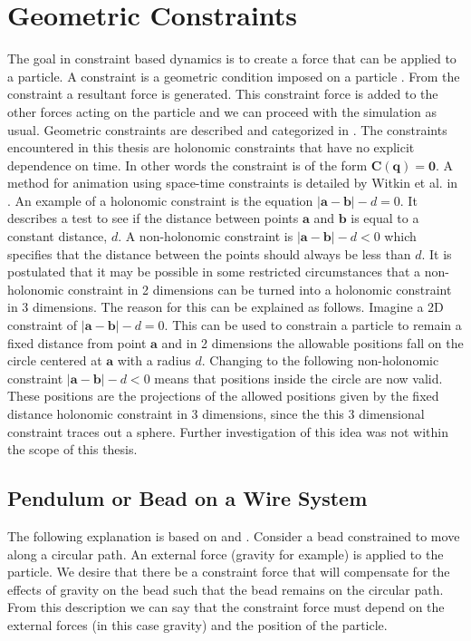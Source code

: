 \section{Geometric Constraints} The goal in constraint based dynamics is to
create a force that can be applied to a particle. A constraint is a geometric
condition imposed on a particle \cite{BarzelBarr}. From the constraint a
resultant force is generated.  This constraint force is added to the other
forces acting on the particle and we can proceed with the simulation as usual.
Geometric constraints are described and categorized in \cite{Goldstein,
ComputationalDynamics, Lee}. The constraints encountered in this thesis are
holonomic constraints that have no explicit dependence on time. In other words
the constraint is of the form $\mathbf{C(q)} = \mathbf{0}$. A method for
animation using space-time constraints is detailed by Witkin et al. in
\cite{SpacetimeConstraints}. An example of a holonomic constraint is the
equation $\vert \mathbf{a} - \mathbf{b} \vert - d = 0$. It describes a test to
see if the distance between points $\mathbf{a}$ and $\mathbf{b}$ is equal to a
constant distance, $d$. A non-holonomic constraint is $\vert \mathbf{a} -
\mathbf{b} \vert - d < 0$ which specifies that the distance between the points
should always be less than $d$. It is postulated that it may be possible in some
restricted circumstances that a non-holonomic constraint in 2 dimensions can be
turned into a holonomic constraint in 3 dimensions. The reason for this can be
explained as follows. Imagine a 2D constraint of $\vert \mathbf{a} - \mathbf{b}
\vert - d = 0$. This can be used to constrain a particle to remain a fixed
distance from point $\mathbf{a}$ and in 2 dimensions the allowable positions
fall on the circle centered at $\mathbf{a}$ with a radius $d$. Changing to the
following non-holonomic constraint $\vert \mathbf{a} - \mathbf{b} \vert - d < 0$
means that positions inside the circle are now valid.  These positions are the
projections of the allowed positions given by the fixed distance holonomic
constraint in 3 dimensions, since the this 3 dimensional constraint traces out a
sphere. Further investigation of this idea was not within the scope of this
thesis.

\subsection{Pendulum or Bead on a Wire System}
\label{SubSec:Pendulum}
The following explanation is based on \cite{PBMNotes} and \cite{Otte}.  Consider
a bead constrained to move along a circular path. An external force (gravity for
example) is applied to the particle. We desire that there be a constraint force
that will compensate for the effects of gravity on the bead such that the bead
remains on the circular path. From this description we can say that the
constraint force must depend on the external forces (in this case gravity) and
the position of the particle. 

